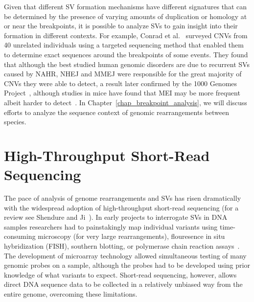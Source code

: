 Given that different SV formation mechanisms have different signatures that can be determined by the presence of varying amounts of duplication or homology at or near the breakpoints, it is possible to analyze SVs to gain insight into their formation in different contexts. For example, Conrad et al.~\cite{Conrad:2010if} surveyed CNVs from 40 unrelated individuals using a targeted sequencing method that enabled them to determine exact sequences around the breakpoints of some events. They found that although the best studied human genomic disorders are due to recurrent SVs caused by NAHR, NHEJ and MMEJ were responsible for the great majority of CNVs they were able to detect, a result later confirmed by the 1000 Genomes Project~\cite{Mills:2011p1611}, although studies in mice have found that MEI may be more frequent albeit harder to detect~\cite{Yalcin:2011tm}.  In Chapter~\ref{chap_breakpoint_analysis}, we will discuss efforts to analyze the sequence context of genomic rearrangements between species.

\section{High-Throughput Short-Read Sequencing}

The pace of analysis of genome rearrangements and SVs has risen dramatically with the widespread adoption of high-throughput short-read sequencing (for a review see Shendure and Ji~\cite{Shendure:2008jh}). In early projects to interrogate SVs in DNA samples researchers had to painstakingly map individual variants using time-consuming microscopy (for very large rearrangements), flouresence in situ hybridization (FISH), southern blotting, or polymerase chain reaction assays~\cite{Aten:2008dh}. The development of microarray technology allowed simultaneous testing of many genomic probes on a sample, although the probes had to be developed using prior knowledge of what variants to expect. Short-read sequencing, however, allows direct DNA sequence data to be collected in a relatively unbiased way from the entire genome, overcoming these limitations.

